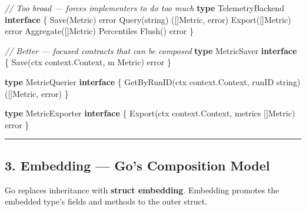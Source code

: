 \documentclass[
]{article}
\newenvironment{Shaded}{}{}
\newcommand{\CommentTok}[1]{\textcolor[rgb]{0.38,0.63,0.69}{\textit{#1}}}
\newcommand{\DataTypeTok}[1]{\textcolor[rgb]{0.56,0.13,0.00}{#1}}
\newcommand{\KeywordTok}[1]{\textcolor[rgb]{0.00,0.44,0.13}{\textbf{#1}}}
\newcommand{\NormalTok}[1]{#1}
\newcommand{\OperatorTok}[1]{\textcolor[rgb]{0.40,0.40,0.40}{#1}}
\begin{document}
\begin{Shaded}
\begin{Highlighting}[]
\CommentTok{// Too broad — forces implementers to do too much}
\KeywordTok{type}\NormalTok{ TelemetryBackend }\KeywordTok{interface} \OperatorTok{\{}
\NormalTok{    Save}\OperatorTok{(}\NormalTok{Metric}\OperatorTok{)} \DataTypeTok{error}
\NormalTok{    Query}\OperatorTok{(}\DataTypeTok{string}\OperatorTok{)} \OperatorTok{([]}\NormalTok{Metric}\OperatorTok{,} \DataTypeTok{error}\OperatorTok{)}
\NormalTok{    Export}\OperatorTok{([]}\NormalTok{Metric}\OperatorTok{)} \DataTypeTok{error}
\NormalTok{    Aggregate}\OperatorTok{([]}\NormalTok{Metric}\OperatorTok{)}\NormalTok{ Percentiles}
\NormalTok{    Flush}\OperatorTok{()} \DataTypeTok{error}
\OperatorTok{\}}

\CommentTok{// Better — focused contracts that can be composed}
\KeywordTok{type}\NormalTok{ MetricSaver }\KeywordTok{interface} \OperatorTok{\{}
\NormalTok{    Save}\OperatorTok{(}\NormalTok{ctx context}\OperatorTok{.}\NormalTok{Context}\OperatorTok{,}\NormalTok{ m Metric}\OperatorTok{)} \DataTypeTok{error}
\OperatorTok{\}}

\KeywordTok{type}\NormalTok{ MetricQuerier }\KeywordTok{interface} \OperatorTok{\{}
\NormalTok{    GetByRunID}\OperatorTok{(}\NormalTok{ctx context}\OperatorTok{.}\NormalTok{Context}\OperatorTok{,}\NormalTok{ runID }\DataTypeTok{string}\OperatorTok{)} \OperatorTok{([]}\NormalTok{Metric}\OperatorTok{,} \DataTypeTok{error}\OperatorTok{)}
\OperatorTok{\}}

\KeywordTok{type}\NormalTok{ MetricExporter }\KeywordTok{interface} \OperatorTok{\{}
\NormalTok{    Export}\OperatorTok{(}\NormalTok{ctx context}\OperatorTok{.}\NormalTok{Context}\OperatorTok{,}\NormalTok{ metrics }\OperatorTok{[]}\NormalTok{Metric}\OperatorTok{)} \DataTypeTok{error}
\OperatorTok{\}}
\end{Highlighting}
\end{Shaded}

\begin{center}\rule{0.5\linewidth}{0.5pt}\end{center}

\hypertarget{embedding-gos-composition-model}{%
\subsection{3. Embedding --- Go's Composition
Model}\label{embedding-gos-composition-model}}

Go replaces inheritance with \textbf{struct embedding}. Embedding
promotes the embedded type's fields and methods to the outer struct.
\end{document}
